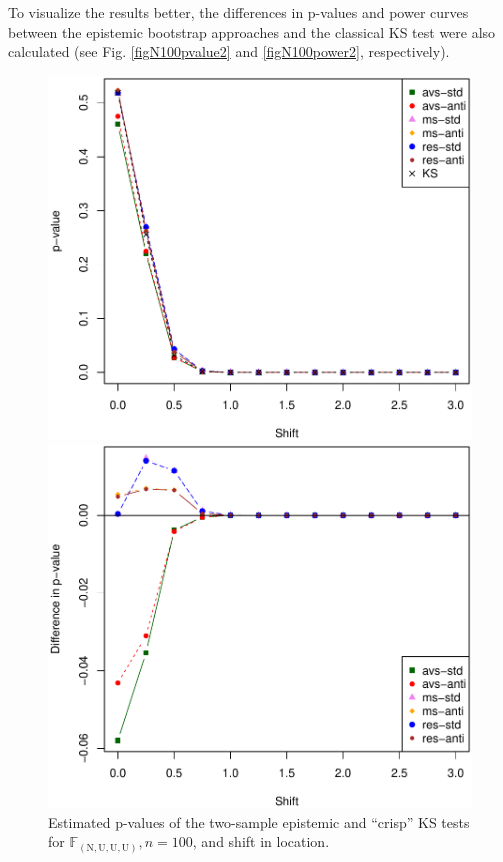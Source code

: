 To visualize the results better, the differences in p-values and power curves between the epistemic bootstrap approaches and the classical KS test were also calculated (see Fig. \ref{figN100pvalue2} and \ref{figN100power2}, respectively).

\begin{figure}[htb]
  \centering
	\begin{minipage}[t]{0.42\linewidth}
	\vspace{0pt}
	\includegraphics[scale=0.42]{pvalue_N100_rys01.pdf}
	\caption{Estimated p-values of the two-sample epistemic and ``crisp'' KS tests for $\mathbb{F}_{(\mathrm{N,U,U,U})}, n=100$, and shift in location.}
	\label{figN100pvalue1}
	\end{minipage}  
\hfill
\begin{minipage}[t]{0.45\linewidth}
\vspace{0pt}
	\includegraphics[scale=0.42]{diff_pvalue_N100_rys01.pdf}

\end{minipage}
\end{figure}
